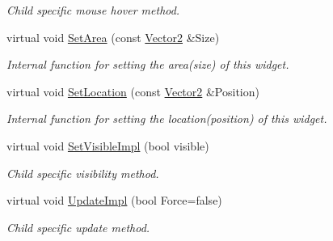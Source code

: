 \begin{DoxyCompactItemize}
\begin{DoxyCompactList}\small\item\em Child specific mouse hover method. \item\end{DoxyCompactList}\item 
\hypertarget{classMezzanine_1_1UI_1_1RenderableContainerWidget_ab9c2025cfebccefe25402d1cdef2fbec}{
virtual void \hyperlink{classMezzanine_1_1UI_1_1RenderableContainerWidget_ab9c2025cfebccefe25402d1cdef2fbec}{SetArea} (const \hyperlink{classMezzanine_1_1Vector2}{Vector2} \&Size)}
\label{classMezzanine_1_1UI_1_1RenderableContainerWidget_ab9c2025cfebccefe25402d1cdef2fbec}

\begin{DoxyCompactList}\small\item\em Internal function for setting the area(size) of this widget. \item\end{DoxyCompactList}\item 
\hypertarget{classMezzanine_1_1UI_1_1RenderableContainerWidget_a25b447380d4f11aeec35f87858037c93}{
virtual void \hyperlink{classMezzanine_1_1UI_1_1RenderableContainerWidget_a25b447380d4f11aeec35f87858037c93}{SetLocation} (const \hyperlink{classMezzanine_1_1Vector2}{Vector2} \&Position)}
\label{classMezzanine_1_1UI_1_1RenderableContainerWidget_a25b447380d4f11aeec35f87858037c93}

\begin{DoxyCompactList}\small\item\em Internal function for setting the location(position) of this widget. \item\end{DoxyCompactList}\item 
\hypertarget{classMezzanine_1_1UI_1_1RenderableContainerWidget_a6e1275f6ab381dfc0832422e5cefa817}{
virtual void \hyperlink{classMezzanine_1_1UI_1_1RenderableContainerWidget_a6e1275f6ab381dfc0832422e5cefa817}{SetVisibleImpl} (bool visible)}
\label{classMezzanine_1_1UI_1_1RenderableContainerWidget_a6e1275f6ab381dfc0832422e5cefa817}

\begin{DoxyCompactList}\small\item\em Child specific visibility method. \item\end{DoxyCompactList}\item 
\hypertarget{classMezzanine_1_1UI_1_1RenderableContainerWidget_aff6cb63e616af69948941a0db8183b80}{
virtual void \hyperlink{classMezzanine_1_1UI_1_1RenderableContainerWidget_aff6cb63e616af69948941a0db8183b80}{UpdateImpl} (bool Force=false)}
\label{classMezzanine_1_1UI_1_1RenderableContainerWidget_aff6cb63e616af69948941a0db8183b80}

\begin{DoxyCompactList}\small\item\em Child specific update method. \item\end{DoxyCompactList}\end{DoxyCompactItemize}
